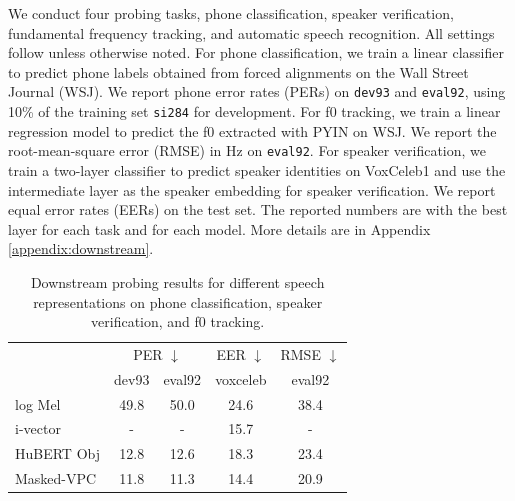 \documentclass[11pt,a4paper]{article}
\begin{document}
%
%
%
%
%
%
%
%

We conduct four probing tasks, phone classification, speaker verification, fundamental frequency tracking, and automatic speech recognition.
All settings follow \citet{yang2022autoregressive} unless otherwise noted.
For phone classification, we train a linear classifier to predict phone labels obtained from forced alignments on the Wall Street Journal \citep{paul1992design} (WSJ).
We report phone error rates (PERs) on \texttt{dev93} and \texttt{eval92}, using 
10\% of the training set \texttt{si284} for development.
For f0 tracking, we train a linear regression model to predict the f0 extracted with PYIN \citep{mauch2014pyin} on WSJ.
We report the root-mean-square error (RMSE) in Hz on \texttt{eval92}.
For speaker verification, we train a two-layer classifier to predict speaker identities on VoxCeleb1 \citep{nagrani2020voxceleb} and use the intermediate layer as the speaker embedding for speaker verification.
We report equal error rates (EERs) on the test set.
The reported numbers are with the best layer for each task and for each model.
More details are in Appendix \ref{appendix:downstream}.

%
%
%
%
%
%
%
%
%
%
%
%

%
%
%
%
%
%
%

%
%
%
%
%

\begin{table}
    \caption{Downstream probing results for different speech representations
        on phone classification, speaker verification, and f0 tracking.}
    \label{tab:downstream1}
    \centering
    \footnotesize
    \begin{tabularx}{0.98\linewidth}{lcccc}
            \toprule
                    &\multicolumn{2}{c}{PER $\downarrow$} &EER $\downarrow$ &RMSE $\downarrow$  \\
                    &dev93 &eval92 &voxceleb &eval92  \\[1pt]
            \midrule
            log Mel       &49.8          &50.0       &24.6        &38.4 \\
            i-vector      &-             &-          &15.7        &-    \\
            HuBERT Obj            &12.8          &12.6          &18.3      &23.4  \\
            Masked-VPC        &11.8          &11.3          &14.4      &20.9  \\
            \bottomrule
    \end{tabularx}
\end{table}
\end{document}
